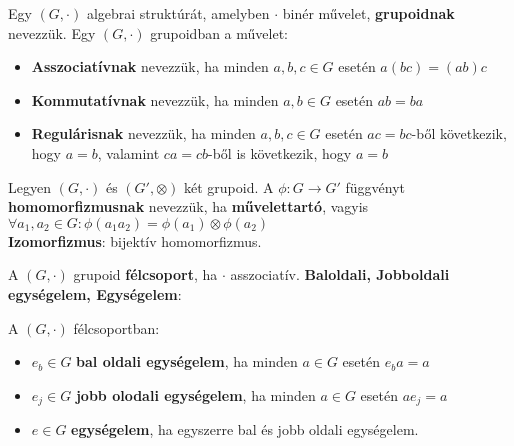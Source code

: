 \begin{frame}
  \begin{tcolorbox}[title={Def.: Grupoid}]
    Egy $(G, {\cdot})$ algebrai struktúrát, amelyben $\cdot$ binér művelet, \textbf{grupoidnak} nevezzük.
  \tcblower
    Egy $(G, {\cdot})$ grupoidban a művelet:\\

    \begin{itemize}
      \item \textbf{Asszociatívnak} nevezzük, ha minden $a, b, c \in G$ esetén $a(bc) = (ab)c$
      \item \textbf{Kommutatívnak} nevezzük, ha minden $a, b \in G$ esetén $ab = ba$
      \item \textbf{Regulárisnak} nevezzük, ha minden $a, b, c \in G$ esetén $ac = bc$-ből következik, hogy $a = b$, valamint $ca = cb$-ből is következik, hogy $a = b$
    \end{itemize}
  \end{tcolorbox}

  \begin{tcolorbox}[title={Def.: Morfizmusok}]
    Legyen $(G, {\cdot})$ és $(G', {\otimes})$ két grupoid. A ${\phi} : G \rightarrow G'$ függvényt \textbf{homomorfizmusnak} nevezzük, ha \textbf{művelettartó}, vagyis ${\forall}a_1, a_2 \in G : {\phi}(a_1a_2) = {\phi}(a_1) \otimes {\phi}(a_2)$\\

    \textbf{Izomorfizmus}: bijektív homomorfizmus.
  \end{tcolorbox}

  \begin{tcolorbox}[title={Def.: Félcsoport}]
    A $(G, {\cdot})$ grupoid \textbf{félcsoport}, ha $\cdot$ asszociatív.
  \tcblower
    \textbf{Baloldali, Jobboldali egységelem, Egységelem}:\\
    \mmedskip
    
    A $(G, {\cdot})$  félcsoportban:\\
    \begin{itemize}
      \item $e_b \in G$ \textbf{bal oldali egységelem}, ha minden $a \in G$ esetén $e_ba = a$
      \item $e_j \in G$ \textbf{jobb olodali egységelem}, ha minden $a \in G$ esetén $ae_j = a$
      \item $e \in G$ \textbf{egységelem}, ha egyszerre bal és jobb oldali egységelem.
    \end{itemize}
  \end{tcolorbox}
\end{frame}


